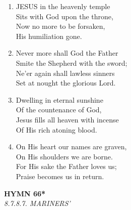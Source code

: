 \documentclass[11pt,a4paper]{article}
\begin{document}
\begin{enumerate}
    \item JESUS in the heavenly temple \\
        Sits with God upon the throne, \\
        Now no more to be forsaken, \\
        His humiliation gone.

    \item Never more shall God the Father \\
        Smite the Shepherd with the sword; \\
        Ne'er again shall lawless sinners \\
        Set at nought the glorious Lord.

    \item Dwelling in eternal sunshine \\
        Of the countenance of God, \\
        Jesus fills all heaven with incense \\
        Of His rich atoning blood.

    \item On His heart our names are graven, \\
        On His shoulders we are borne. \\
        For His sake the Father loves us; \\
        Praise becomes us in return.

\end{enumerate}

\newpage
\begin{center}
    {\Large \textbf{HYMN 66*}}
    \\
    \textit{8.7.8.7. MARINERS'}
\end{center}
\vspace{1em}
\end{document}
